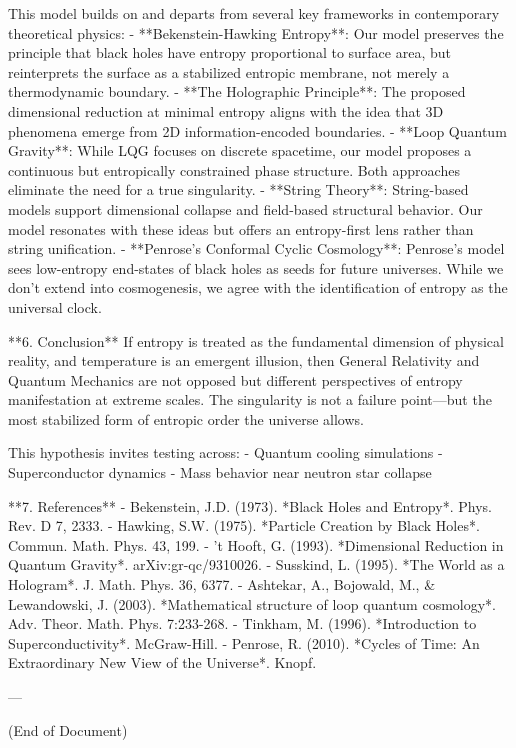 This model builds on and departs from several key frameworks in contemporary theoretical physics:
- **Bekenstein-Hawking Entropy**: Our model preserves the principle that black holes have entropy proportional to surface area, but reinterprets the surface as a stabilized entropic membrane, not merely a thermodynamic boundary.
- **The Holographic Principle**: The proposed dimensional reduction at minimal entropy aligns with the idea that 3D phenomena emerge from 2D information-encoded boundaries.
- **Loop Quantum Gravity**: While LQG focuses on discrete spacetime, our model proposes a continuous but entropically constrained phase structure. Both approaches eliminate the need for a true singularity.
- **String Theory**: String-based models support dimensional collapse and field-based structural behavior. Our model resonates with these ideas but offers an entropy-first lens rather than string unification.
- **Penrose’s Conformal Cyclic Cosmology**: Penrose's model sees low-entropy end-states of black holes as seeds for future universes. While we don't extend into cosmogenesis, we agree with the identification of entropy as the universal clock.

**6. Conclusion**
If entropy is treated as the fundamental dimension of physical reality, and temperature is an emergent illusion, then General Relativity and Quantum Mechanics are not opposed but different perspectives of entropy manifestation at extreme scales. The singularity is not a failure point—but the most stabilized form of entropic order the universe allows.

This hypothesis invites testing across:
- Quantum cooling simulations
- Superconductor dynamics
- Mass behavior near neutron star collapse

**7. References**
- Bekenstein, J.D. (1973). *Black Holes and Entropy*. Phys. Rev. D 7, 2333.  
- Hawking, S.W. (1975). *Particle Creation by Black Holes*. Commun. Math. Phys. 43, 199.  
- ’t Hooft, G. (1993). *Dimensional Reduction in Quantum Gravity*. arXiv:gr-qc/9310026.  
- Susskind, L. (1995). *The World as a Hologram*. J. Math. Phys. 36, 6377.  
- Ashtekar, A., Bojowald, M., & Lewandowski, J. (2003). *Mathematical structure of loop quantum cosmology*. Adv. Theor. Math. Phys. 7:233-268.  
- Tinkham, M. (1996). *Introduction to Superconductivity*. McGraw-Hill.  
- Penrose, R. (2010). *Cycles of Time: An Extraordinary New View of the Universe*. Knopf.  

---

(End of Document)


